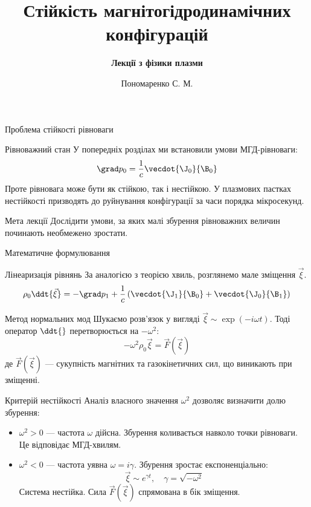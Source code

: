 \documentclass[]{beamer}
\title[Лекції з фізики плазми]{\bfseries\huge Стійкість магнітогідродинамічних конфігурацій}
\subtitle{\bfseries Лекції з фізики плазми}
\author{Пономаренко С. М.}
\date{}
\begin{document}
\begin{frame}
	\titlepage
\end{frame}



\begin{frame}{Проблема стійкості рівноваги}{}
	\begin{block}{Рівноважний стан}\justifying
		У попередніх розділах ми встановили умови МГД-рівноваги:
		\begin{equation*}
			\grad p_0 = \frac{1}{c} \vecdot{\J_0}{\B_0}
		\end{equation*}
		Проте рівновага може бути як стійкою, так і нестійкою. У плазмових пастках нестійкості призводять до руйнування конфігурації за часи порядка мікросекунд.
	\end{block}
	\begin{alertblock}{Мета лекції}\centering
		Дослідити умови, за яких малі збурення рівноважних величин починають необмежено зростати.
	\end{alertblock}
\end{frame}

\begin{frame}{Математичне формулювання}{}
	\begin{block}{Лінеаризація рівнянь}\justifying
		За аналогією з теорією хвиль, розглянемо мале зміщення $\vec{\xi}$.
		\begin{equation*}
			\rho_0 \ddt{\vec{\xi}} = -\grad p_1 + \frac{1}{c} \left( \vecdot{\J_1}{\B_0} + \vecdot{\J_0}{\B_1} \right)
		\end{equation*}
	\end{block}
	\begin{block}{Метод нормальних мод}\justifying
		Шукаємо розв'язок у вигляді $\vec{\xi} \sim \exp(-i\omega t)$. Тоді оператор $\ddt{}$ перетворюється на $-\omega^2$:
		\begin{equation*}
			-\omega^2 \rho_0 \vec{\xi} = \vec{F}(\vec{\xi})
		\end{equation*}
		де $\vec{F}(\vec{\xi})$ --- сукупність магнітних та газокінетичних сил, що виникають при зміщенні.
	\end{block}
\end{frame}

\begin{frame}{Критерій нестійкості}{}
	Аналіз власного значення $\omega^2$ дозволяє визначити долю збурення:
	\begin{itemize}
		\item \textbf{$\omega^2 > 0$} --- частота $\omega$ дійсна. Збурення коливається навколо точки рівноваги. Це відповідає \alert{МГД-хвилям}.
		\item \textbf{$\omega^2 < 0$} --- частота уявна $\omega = i\gamma$. Збурення зростає експоненціально:
		\begin{equation*}
			\vec{\xi} \sim e^{\gamma t}, \quad \gamma = \sqrt{-\omega^2}
		\end{equation*}
		Система \alert{нестійка}. Сила $\vec{F}(\vec{\xi})$ спрямована в бік зміщення.
	\end{itemize}
\end{frame}
\end{document}
